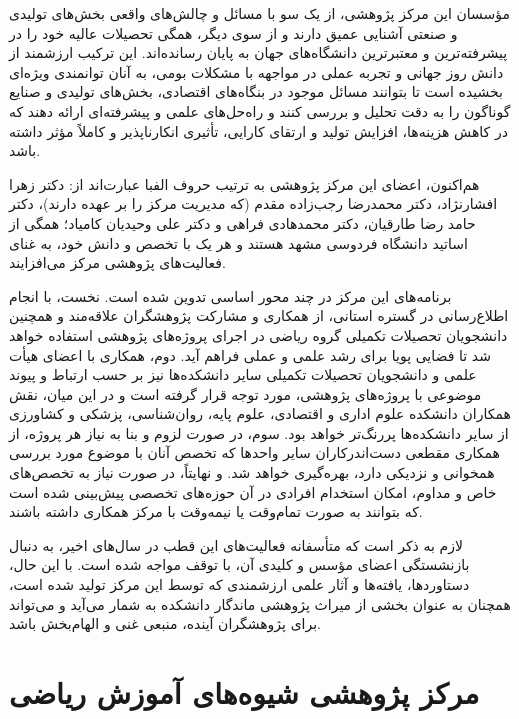 \documentclass[
  letterpaper,
  DIV=11,
  numbers=noendperiod]{scrreprt}
\begin{document}
مؤسسان این مرکز پژوهشی، از یک سو با مسائل و چالش‌های واقعی بخش‌های تولیدی
و صنعتی آشنایی عمیق دارند و از سوی دیگر، همگی تحصیلات عالیه خود را در
پیشرفته‌ترین و معتبرترین دانشگاه‌های جهان به پایان رسانده‌اند. این ترکیب
ارزشمند از دانش روز جهانی و تجربه عملی در مواجهه با مشکلات بومی، به آنان
توانمندی ویژه‌ای بخشیده است تا بتوانند مسائل موجود در بنگاه‌های اقتصادی،
بخش‌های تولیدی و صنایع گوناگون را به دقت تحلیل و بررسی کنند و راه‌حل‌های
علمی و پیشرفته‌ای ارائه دهند که در کاهش هزینه‌ها، افزایش تولید و ارتقای
کارایی، تأثیری انکارناپذیر و کاملاً مؤثر داشته باشد.

هم‌اکنون، اعضای این مرکز پژوهشی به ترتیب حروف الفبا عبارت‌اند از: دکتر
زهرا افشارنژاد، دکتر محمدرضا رجب‌زاده مقدم (که مدیریت مرکز را بر عهده
دارند)، دکتر حامد رضا طارقیان، دکتر محمدهادی فراهی و دکتر علی وحیدیان
کامیاد؛ همگی از اساتید دانشگاه فردوسی مشهد هستند و هر یک با تخصص و دانش
خود، به غنای فعالیت‌های پژوهشی مرکز می‌افزایند.

برنامه‌های این مرکز در چند محور اساسی تدوین شده است. نخست، با انجام
اطلاع‌رسانی در گستره استانی، از همکاری و مشارکت پژوهشگران علاقه‌مند و
همچنین دانشجویان تحصیلات تکمیلی گروه ریاضی در اجرای پروژه‌های پژوهشی
استفاده خواهد شد تا فضایی پویا برای رشد علمی و عملی فراهم آید. دوم،
همکاری با اعضای هیأت علمی و دانشجویان تحصیلات تکمیلی سایر دانشکده‌ها نیز
بر حسب ارتباط و پیوند موضوعی با پروژه‌های پژوهشی، مورد توجه قرار گرفته
است و در این میان، نقش همکاران دانشکده علوم اداری و اقتصادی، علوم پایه،
روان‌شناسی، پزشکی و کشاورزی از سایر دانشکده‌ها پررنگ‌تر خواهد بود. سوم، در
صورت لزوم و بنا به نیاز هر پروژه، از همکاری مقطعی دست‌اندرکاران سایر
واحدها که تخصص آنان با موضوع مورد بررسی همخوانی و نزدیکی دارد، بهره‌گیری
خواهد شد. و نهایتاً، در صورت نیاز به تخصص‌های خاص و مداوم، امکان استخدام
افرادی در آن حوزه‌های تخصصی پیش‌بینی شده است که بتوانند به صورت تمام‌وقت یا
نیمه‌وقت با مرکز همکاری داشته باشند.

لازم به ذکر است که متأسفانه فعالیت‌های این قطب در سال‌های اخیر، به دنبال
بازنشستگی اعضای مؤسس و کلیدی آن، با توقف مواجه شده است. با این حال،
دستاوردها، یافته‌ها و آثار علمی ارزشمندی که توسط این مرکز تولید شده است،
همچنان به عنوان بخشی از میراث پژوهشی ماندگار دانشکده به شمار می‌آید و
می‌تواند برای پژوهشگران آینده، منبعی غنی و الهام‌بخش باشد.

\section{مرکز پژوهشی شیوه‌های آموزش
ریاضی}\label{ux645ux631ux6a9ux632-ux67eux698ux648ux647ux634ux6cc-ux634ux6ccux648ux647ux647ux627ux6cc-ux622ux645ux648ux632ux634-ux631ux6ccux627ux636ux6cc}
\end{document}
